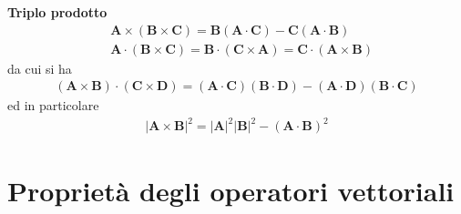 \documentclass[10pt,a4paper]{book}
\begin{document}
\textbf{Triplo prodotto}
\begin{align*}
	&\mathbf{A} \times (\mathbf{B} \times \mathbf{C}) = \mathbf{B} (\mathbf{A} \cdot \mathbf{C}) - \mathbf{C} (\mathbf{A} \cdot \mathbf{B}) \\
	&\mathbf{A} \cdot (\mathbf{B} \times \mathbf{C}) = \mathbf{B} \cdot (\mathbf{C} \times \mathbf{A}) = \mathbf{C} \cdot (\mathbf{A} \times \mathbf{B})
\end{align*}
da cui si ha
\begin{align*}
	(\mathbf{A} \times \mathbf{B}) \cdot (\mathbf{C} \times \mathbf{D}) = (\mathbf{A} \cdot \mathbf{C}) (\mathbf{B} \cdot \mathbf{D}) - (\mathbf{A} \cdot \mathbf{D}) (\mathbf{B} \cdot \mathbf{C})
\end{align*}
ed in particolare
\begin{align*}
	|\mathbf{A} \times \mathbf{B}|^2 = |\mathbf{A}|^2 |\mathbf{B}|^2 - (\mathbf{A} \cdot \mathbf{B})^2
\end{align*}







































\section{Proprietà degli operatori vettoriali}
\end{document}
